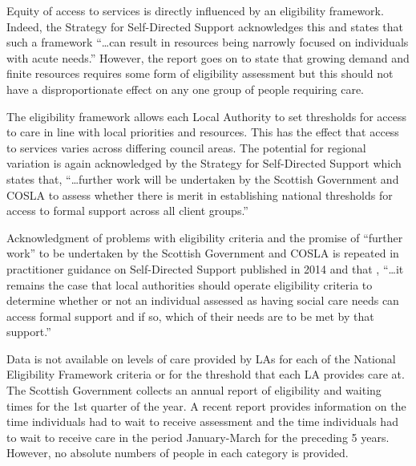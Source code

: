 \documentclass[12pt,]{report}
\begin{document}
Equity of access to services is directly influenced by an eligibility
framework. Indeed, the Strategy for Self-Directed Support
\citep[pp.20]{RN171} acknowledges this and states that such a framework
``\ldots{}can result in resources being narrowly focused on individuals
with acute needs.'' However, the report goes on to state that growing
demand and finite resources requires some form of eligibility assessment
but this should not have a disproportionate effect on any one group of
people requiring care.

The eligibility framework allows each Local Authority to set thresholds
for access to care in line with local priorities and resources. This has
the effect that access to services varies across differing council
areas. The potential for regional variation is again acknowledged by the
Strategy for Self-Directed Support \citep[pp.20]{RN171} which states
that, ``\ldots{}further work will be undertaken by the Scottish
Government and COSLA to assess whether there is merit in establishing
national thresholds for access to formal support across all client
groups.''

Acknowledgment of problems with eligibility criteria and the promise of
``further work'' to be undertaken by the Scottish Government and COSLA
is repeated in practitioner guidance on Self-Directed Support published
in 2014 \citep[pp.19]{RN170} and that , ``\ldots{}it remains the case
that local authorities should operate eligibility criteria to determine
whether or not an individual assessed as having social care needs can
access formal support and if so, which of their needs are to be met by
that support.''

Data is not available on levels of care provided by LAs for each of the
National Eligibility Framework criteria or for the threshold that each
LA provides care at. The Scottish Government collects an annual report
of eligibility and waiting times for the 1st quarter of the year. A
recent report \citep{RN184} provides information on the time individuals
had to wait to receive assessment and the time individuals had to wait
to receive care in the period January-March for the preceding 5 years.
However, no absolute numbers of people in each category is provided.
\end{document}
